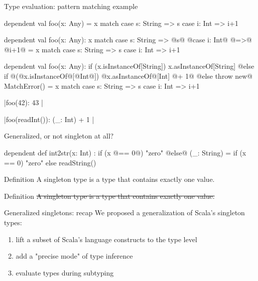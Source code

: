 \documentclass[10pt]{beamer}
\newenvironment{slide}[2][]
  {\begin{frame}[fragile,environment=slide,#1]{#2}}
  {\end{frame}}
\newcommand{\tp}[1]{\color{typeColor}#1}
\begin{document}
\begin{slide}{Type evaluation: pattern matching example}
\begin{overprint}
\begin{code}
dependent val foo(x: Any) =
  x match
    case s: String => s
    case i: Int => i+1
\end{code}
\begin{code}
dependent val foo(x: Any): {
  x match
    case s: String => @\tp{s}@
    @\tp{case i: Int}@ @=>@ @\tp{i+1}@
} =
  x match
    case s: String => s
    case i: Int => i+1
\end{code}
\begin{code}
dependent val foo(x: Any): {
  if (x.isInstanceOf[String]) x.asInstanceOf[String]
  @\tp{else if }@(@\tp{x.isInstanceOf}@[@\tp{Int}@]) @\tp{x.asInstanceOf}@[Int] @\tp{+ 1}@
  @\tp{else throw new}@ MatchError()
} =
  x match
    case s: String => s
    case i: Int => i+1
\end{code}
\end{overprint}
\bigskip
\pause\pause\pause

|foo(42): { 43 }|
\pause

|foo(readInt()): { (_: Int) + 1 }|
\end{slide}

\begin{slide}{Generalized, or not singleton at all?}
\begin{code}
dependent
def int2str(x: Int)
  : { if (x @\tp{== 0}@) "zero" @\tp{else}@ (_: String) }
  =   if (x == 0) "zero" else readString()
\end{code}
\begin{overprint}
\begin{block}{Definition}
A singleton type is a type that contains exactly one value.
\end{block}

\begin{block}{Definition}
\sout{A singleton type is a type that contains exactly one value.}
\end{block}
\end{overprint}
\end{slide}

\begin{slide}{Generalized singletons: recap}
We proposed a generalization of Scala's singleton types:
\begin{enumerate}
  \item lift a subset of Scala's language constructs to the type level
  \item add a "precise mode" of type inference
  \item evaluate types during subtyping
\end{enumerate}
\end{slide}
\end{document}
